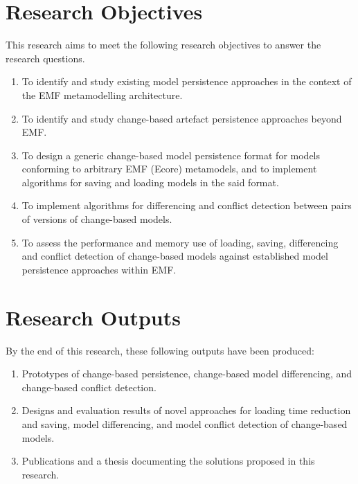 \section{Research Objectives}
\label{sec:research_objectives}
This research aims to meet the following research objectives to answer the research questions.
\begin{enumerate}
\item To identify and study existing model persistence approaches in the context of the EMF metamodelling architecture.
\item To identify and study change-based artefact persistence approaches beyond EMF.
\item To design a generic change-based model persistence format for models conforming to arbitrary EMF (Ecore) metamodels, and to implement algorithms for saving and loading models in the said format.
\item To implement algorithms for differencing and conflict detection between pairs of versions of change-based models.
\item To assess the performance and memory use of loading, saving, differencing and conflict detection of change-based models against established model persistence approaches within EMF.
\end{enumerate}

\section{Research Outputs}
\label{sec:research_outputs}
By the end of this research, these following outputs have been produced:
\begin{enumerate}
\item Prototypes of change-based persistence, change-based model differencing, and change-based conflict detection. 
\item Designs and evaluation results of novel approaches for loading time reduction and saving, model differencing, and model conflict detection of change-based models.
\item Publications \cite{DBLP:conf/models/YohannisKP17,yohannis2018towards,DBLP:conf/models/YohannisRPK18,yohannis2019efficient} and a thesis documenting the solutions proposed in this research.
\end{enumerate}

